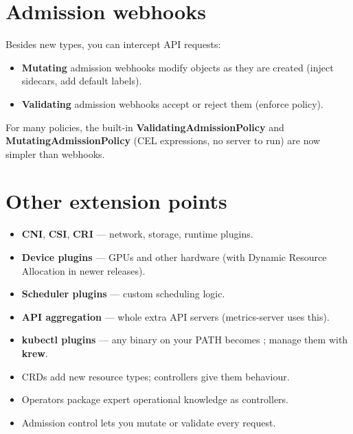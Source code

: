 \section{Admission webhooks}

Besides new types, you can intercept API requests:

\begin{itemize}
  \item \textbf{Mutating} admission webhooks modify objects as they are created
        (inject sidecars, add default labels).
  \item \textbf{Validating} admission webhooks accept or reject them (enforce policy).
\end{itemize}

For many policies, the built-in \textbf{ValidatingAdmissionPolicy} and
\textbf{MutatingAdmissionPolicy} (CEL expressions, no server to run) are now
simpler than webhooks.

\section{Other extension points}

\begin{itemize}
  \item \textbf{CNI}, \textbf{CSI}, \textbf{CRI} --- network, storage, runtime plugins.
  \item \textbf{Device plugins} --- GPUs and other hardware (with Dynamic Resource Allocation in newer releases).
  \item \textbf{Scheduler plugins} --- custom scheduling logic.
  \item \textbf{API aggregation} --- whole extra API servers (metrics-server uses this).
  \item \textbf{kubectl plugins} --- any  binary on your PATH
        becomes ; manage them with \textbf{krew}.
\end{itemize}

\begin{recap}
\begin{itemize}
  \item CRDs add new resource types; controllers give them behaviour.
  \item Operators package expert operational knowledge as controllers.
  \item Admission control lets you mutate or validate every request.
\end{itemize}
\end{recap}
